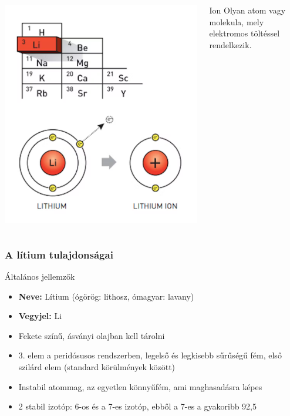 \documentclass{beamer}
\begin{document}
\begin{frame}
\begin{columns}
	\begin{column}{0.5\textwidth}
		\includegraphics[scale=0.2]{lithiumion}
	\end{column}
	\begin{column}{0.4\textwidth}
		\begin{block}{Ion}
			Olyan atom vagy molekula, mely elektromos töltéssel rendelkezik.
		\end{block}
	\end{column}
\end{columns}
\end{frame}

\begin{frame}
\frametitle{A lítium tulajdonságai}
\begin{block}{Általános jellemzők}
\begin{itemize}
\item \textbf{Neve:} Lítium (ógörög: lithosz, ómagyar: lavany)
\item \textbf{Vegyjel:} Li
\item Fekete színű, ásványi olajban kell tárolni
\item 3. elem a peridósusos rendszerben, legelső és legkisebb sűrűségű fém, első szilárd elem (standard körülmények között)
\item Instabil atommag, az egyetlen könnyűfém, ami maghasadásra képes
\item 2 stabil izotóp: 6-os és a 7-es izotóp, ebből a 7-es a gyakoribb 92,5%
\end{itemize}
\end{block}
\end{frame}
\end{document}
